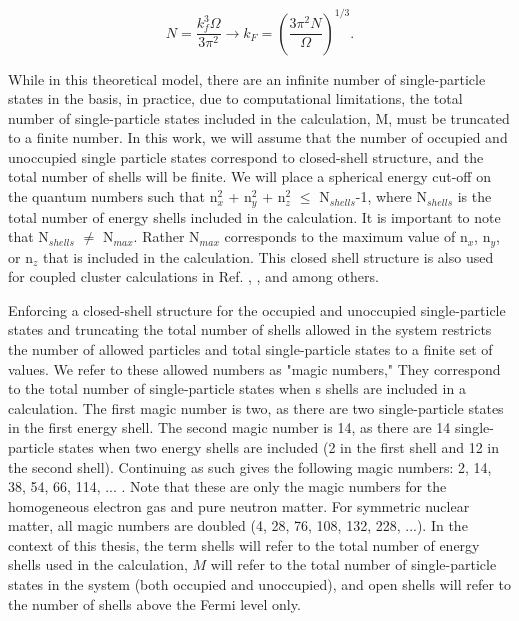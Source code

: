 \begin{equation}
	N = \frac{k_f^3\Omega}{3\pi^2} \longrightarrow k_F = (\frac{3\pi^2N}{\Omega})^{1/3}.
\end{equation}

While in this theoretical model, there are an infinite number of single-particle states in the basis, in practice, due to computational limitations, the total number of single-particle states included in the calculation, M, must be truncated to a finite number. In this work, we will assume that the number of occupied and unoccupied single particle states correspond to closed-shell structure, and the total number of shells will be finite. We will place a spherical energy cut-off on the quantum numbers such that n$_x^2$ + n$_y^2$ + n$_z^2$ $\leq$ N$_{shells}$-1, where N$_{shells}$ is the total number of energy shells included in the calculation. It is important to note that N$_{shells}$ $\neq$ N$_{max}$.  Rather N$_{max}$ corresponds to the maximum value of n$_{x}$, n$_{y}$, or n$_{z}$ that is included in the calculation. This closed shell structure is also used for coupled cluster calculations in Ref. \cite{Ref3}, \cite{Ref5}, and \cite{Ref8} among others.

Enforcing a closed-shell structure for the occupied and unoccupied single-particle states and truncating the total number of shells allowed in the system restricts the number of allowed particles and total single-particle states to a finite set of values. We refer to these allowed numbers as "magic numbers," They correspond to the total number of single-particle states when s shells are included in a calculation. The first magic number is two, as there are two single-particle states in the first energy shell. The second magic number is 14, as there are 14 single-particle states when two energy shells are included (2 in the first shell and 12 in the second shell). Continuing as such gives the following magic numbers: 2, 14, 38, 54, 66, 114, ... .  Note that these are only the magic numbers for the homogeneous electron gas and pure neutron matter. For symmetric nuclear matter, all magic numbers are doubled (4, 28, 76, 108, 132, 228, ...). In the context of this thesis, the term shells will refer to the total number of energy shells used in the calculation, $M$ will refer to the total number of single-particle states in the system (both occupied and unoccupied), and open shells will refer to the number of shells above the Fermi level only.